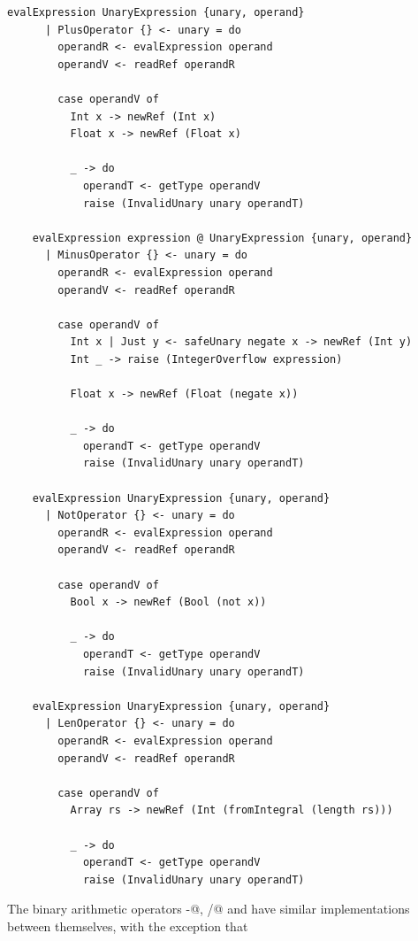 \documentclass[UdineBachThesis,american,11pt]{PhdThesis}
\begin{document}
  \begin{lstlisting}[gobble=4,basicstyle=\ttfamily\small]
    evalExpression UnaryExpression {unary, operand}
      | PlusOperator {} <- unary = do
        operandR <- evalExpression operand
        operandV <- readRef operandR

        case operandV of
          Int x -> newRef (Int x)
          Float x -> newRef (Float x)

          _ -> do
            operandT <- getType operandV
            raise (InvalidUnary unary operandT)

    evalExpression expression @ UnaryExpression {unary, operand}
      | MinusOperator {} <- unary = do
        operandR <- evalExpression operand
        operandV <- readRef operandR

        case operandV of
          Int x | Just y <- safeUnary negate x -> newRef (Int y)
          Int _ -> raise (IntegerOverflow expression)

          Float x -> newRef (Float (negate x))

          _ -> do
            operandT <- getType operandV
            raise (InvalidUnary unary operandT)

    evalExpression UnaryExpression {unary, operand}
      | NotOperator {} <- unary = do
        operandR <- evalExpression operand
        operandV <- readRef operandR

        case operandV of
          Bool x -> newRef (Bool (not x))

          _ -> do
            operandT <- getType operandV
            raise (InvalidUnary unary operandT)

    evalExpression UnaryExpression {unary, operand}
      | LenOperator {} <- unary = do
        operandR <- evalExpression operand
        operandV <- readRef operandR

        case operandV of
          Array rs -> newRef (Int (fromIntegral (length rs)))

          _ -> do
            operandT <- getType operandV
            raise (InvalidUnary unary operandT)
  \end{lstlisting}

  The binary arithmetic operators \lstinline@-@, \lstinline@/@ and \lstinline@%@
  have similar implementations between themselves, with the exception that
  \lstinline@%@ supports only \lstinline@Int@s, and that both \lstinline@/@ and
  \lstinline@%@ raise an exception if the dividend is 0.
\end{document}
